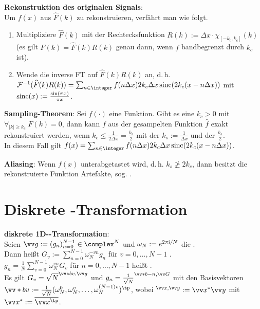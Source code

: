 \textbf{Rekonstruktion des originalen Signals}:\\
Um $f(x)$ aus $\widehat{F}(k)$ zu rekonstruieren, verfährt man wie folgt.
\begin{enumerate}
    \item
    Multipliziere $\widehat{F}(k)$ mit der Rechtecksfunktion
    $R(k) := \Delta x \cdot \chi_{[-k_c,k_c]}(k)$\\
    (es gilt $F(k) = \widehat{F}(k) R(k)$ genau dann, wenn $f$ bandbegrenzt durch $k_c$ ist).

    \item
    Wende die inverse FT auf $\widehat{F}(k) R(k)$ an, d.\,h.\\
    $\F^{-1}(\widehat{F}(k) R(k))
    = \sum_{n \in \integer} f(n\Delta x) 2k_c \Delta x \sinc(2k_c (x - n\Delta x))$
    mit $\operatorname{sinc}(x) := \frac{\sin(\pi x)}{\pi x}$.
\end{enumerate}

\textbf{Sampling-Theorem}:
Sei $f(\cdot)$ eine Funktion.
Gibt es eine  $k_c > 0$ mit\\
$\forall_{|k| \ge k_c}\; F(k) = 0$, dann kann $f$ aus der
gesampelten Funktion $\widehat{f}$ exakt rekonstruiert werden,
wenn $k_c \le \frac{1}{2 \Delta x} = \frac{k_s}{2}$
mit der  $k_s := \frac{1}{\Delta x}$ und
der  $\frac{k_s}{2}$.\\
In diesem Fall gilt
$f(x) = \sum_{n \in \integer} f(n\Delta x) 2k_c \Delta x \sinc(2k_c (x - n\Delta x))$.

\textbf{Aliasing}:
Wenn $f(x)$ unterabgetastet wird, d.\,h. $k_s \not\ge 2k_c$,
dann besitzt die rekonstruierte Funktion Artefakte, sog. .

\section{%
    Diskrete -Transformation%
}

\textbf{diskrete 1D--Transformation}:\\
Seien $\vec{g} := (g_n)_{n=0}^{N-1} \in \complex^N$
und $\omega_N := e^{2\pi\text{i}/N}$ die .\\
Dann heißt
$G_v := \sum_{n=0}^{N-1} \omega_N^{-vn} g_n$ für $v = 0, \dotsc, N - 1$
.\\
$g_n = \frac{1}{N} \sum_{v=0}^{N-1} \omega_N^{vn} G_v$ für $n = 0, \dotsc, N - 1$
heißt .\\
Es gilt $G_v = \sqrt{N} \sp{\vec*{b}{v}, \vec{g}}$
und $g_n = \frac{1}{\sqrt{N}} \sp{\vec*{b}{-n}, \vec{G}}$ mit den Basisvektoren\\
$\vec*{b}{v} := \frac{1}{\sqrt{N}}
(\omega_N^0, \omega_N^{v}, \dotsc, \omega_N^{(N-1)v})^\tp$,
wobei $\sp{\vec{x}, \vec{y}} := \vec{x}^\ast \vec{y}$ mit
$\vec{x}^\ast := \overline{\vec{x}^\tp}$.

